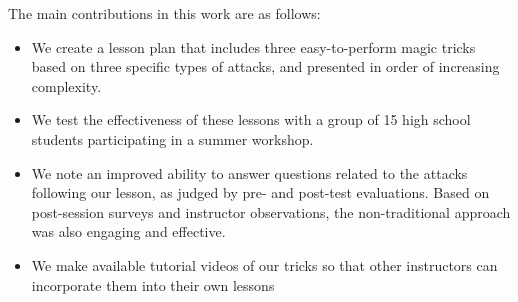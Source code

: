 The main contributions in this work are as follows:

\begin{itemize}

\item{We create a lesson plan that includes three easy-to-perform magic
  tricks based on three specific types of attacks,
    and presented in order of increasing complexity.}

\item{We test the effectiveness of these lessons with
  a group of 15 high school students
  participating in a summer workshop.}

\item{We note an improved ability to answer questions related to the
  attacks following our lesson,
    as judged by pre- and post-test evaluations.  Based on post-session
    surveys and instructor observations, the non-traditional approach was
    also engaging and effective.}

\item{We make available tutorial videos of our tricks so that other
  instructors can incorporate them into their own lessons}

\end{itemize}
